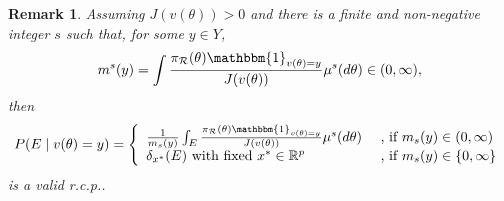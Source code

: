 \documentclass[10pt,fleqn]{article}
\newtheorem{remark}{Remark}
\newcommand{\be}{\begin{equation}\begin{aligned}}
\newcommand{\ee}{\end{aligned}\end{equation}}
\newcommand{\bb}[1]{\mathbb{#1}}
\newcommand{\mc}[1]{\mathcal{#1}}
\DeclareMathOperator{\1}{\mathbbm{1}}
\begin{document}
\begin{remark}
Assuming $J(v(\theta))> 0$ and there is a finite and
non-negative integer $s$ such
that, for some $y\in Y$,
\be
m^{s}(y)=\int \frac{\pi_{\mc
R}(\theta)
\mathbbm{1}_{v({\theta})=y}}{J(v(\theta))}\mu^s(d\theta)\in(0,\infty),
\ee
then
\begin{equation}
P(E\mid v(\theta)=y)=\left\{\begin{array}{ll}  \frac{1}{m_s(y)}\int_{E } \frac{\pi_{\mc
R}(\theta) \mathbbm{1}_{v({\theta})=y}}{J(v(\theta))}\mu^s(d\theta)
& \text{  , if }m_s(y)\in(0,\infty) \\
\delta_{x^*}(E) \text{ with fixed } x^*\in \bb R^p
& \text{  , if }m_s(y)\in\{0,\infty\} \\
\end{array}\right.
\end{equation}
is a valid r.c.p..
\end{remark}
\end{document}
